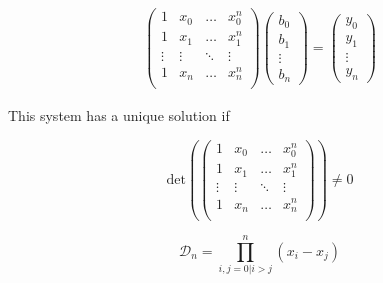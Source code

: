 \begin{align} 
    \begin{pmatrix} 
        1 &x_0 &\hdots &x_0^n \\
        1 &x_1 &\hdots &x_1^n \\
        \vdots &\vdots &\ddots &\vdots \\
        1 &x_n &\hdots &x_n^n \\
    \end{pmatrix}
    \begin{pmatrix} 
        b_0 \\
        b_1 \\
        \vdots \\
        b_n
    \end{pmatrix} = 
    \begin{pmatrix} 
        y_0 \\ y_1 \\ \vdots \\ y_n
    \end{pmatrix}
\end{align}

This system has a unique solution if

\[\mathrm{det}\left(\begin{pmatrix} 
    1 &x_0 &\hdots &x_0^n \\
    1 &x_1 &\hdots &x_1^n \\
    \vdots &\vdots &\ddots &\vdots \\
    1 &x_n &\hdots &x_n^n \\
\end{pmatrix}\right) \neq 0\]

\begin{lemma} 
    \[\mathcal{D}_n = \prod_{i,j=0 | i>j}^{n}(x_i - x_j)\]
\end{lemma}